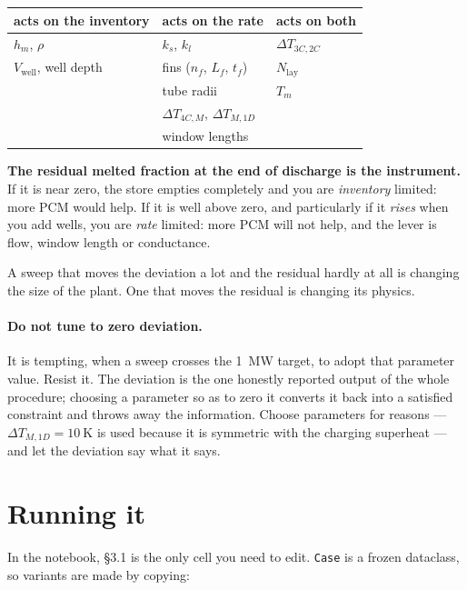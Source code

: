 \documentclass[11pt,a4paper]{article}
\newcommand{\hm}{\ensuremath{h_{m}}}
\newcommand{\Tm}{\ensuremath{T_{m}}}
\newcommand{\code}[1]{\texttt{\small #1}}
\begin{document}
\begin{center}
\begin{tabular}{@{}l l l@{}}
\toprule
acts on the \textbf{inventory} & acts on the \textbf{rate} & acts on both \\
\midrule
$\hm$, $\rho$ & $k_s$, $k_l$ & $\Delta T_{3C,2C}$ \\
$V_{\mathrm{well}}$, well depth & fins ($n_f$, $L_f$, $t_f$) & $N_{\mathrm{lay}}$ \\
 & tube radii & $\Tm$ \\
 & $\Delta T_{4C,M}$, $\Delta T_{M,1D}$ & \\
 & window lengths & \\
\bottomrule
\end{tabular}
\end{center}

\textbf{The residual melted fraction at the end of discharge is the
instrument.} If it is near zero, the store empties completely and you are
\emph{inventory} limited: more PCM would help. If it is well above zero, and
particularly if it \emph{rises} when you add wells, you are \emph{rate} limited:
more PCM will not help, and the lever is flow, window length or conductance.

A sweep that moves the deviation a lot and the residual hardly at all is
changing the size of the plant. One that moves the residual is changing its
physics.

\paragraph{Do not tune to zero deviation.}
It is tempting, when a sweep crosses the \SI{1}{\mega\watt} target, to adopt
that parameter value. Resist it. The deviation is the one honestly reported
output of the whole procedure; choosing a parameter so as to zero it converts it
back into a satisfied constraint and throws away the information. Choose
parameters for reasons --- $\Delta T_{M,1D}=\SI{10}{\kelvin}$ is used because it
is symmetric with the charging superheat --- and let the deviation say what it
says.

\section{Running it}
\label{sec:running}

In the notebook, \S3.1 is the only cell you need to edit. \code{Case} is a
frozen dataclass, so variants are made by copying:
\end{document}
